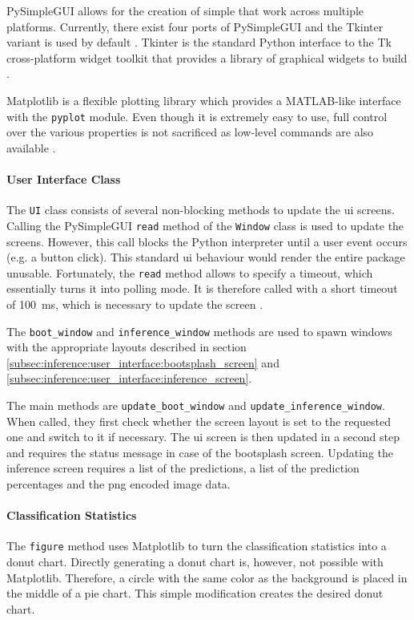 PySimpleGUI allows for the creation of simple  that work across multiple platforms.
Currently, there exist four ports of PySimpleGUI and the Tkinter variant is used by default \cite{inf_pysimplegui}.
Tkinter is the standard Python interface to the Tk cross-platform widget toolkit that provides a library of graphical widgets to build  \cite{inf_tkinter}.

Matplotlib is a flexible plotting library which provides a MATLAB-like interface with the \texttt{pyplot} module.
Even though it is extremely easy to use, full control over the various properties is not sacrificed as low-level commands are also available \cite{inf_matplotlib}.

\paragraph{User Interface Class}
The \texttt{UI} class consists of several non-blocking methods to update the \acrlong{ui} screens.
Calling the PySimpleGUI \texttt{read} method of the \texttt{Window} class is used to update the screens.
However, this call blocks the Python interpreter until a user event occurs (e.g. a button click).
This standard \acrlong{ui} behaviour would render the entire package unusable.
Fortunately, the \texttt{read} method allows to specify a timeout, which essentially turns it into polling mode.
It is therefore called with a short timeout of \SI{100}{ms}, which is necessary to update the screen \cite{inf_pysimplegui_ref}.

The \texttt{boot\_window} and \texttt{inference\_window} methods are used to spawn windows with the appropriate layouts described in section \ref{subsec:inference:user_interface:bootsplash_screen} and \ref{subsec:inference:user_interface:inference_screen}.

The main methods are \texttt{update\_boot\_window} and \texttt{update\_inference\_window}.
When called, they first check whether the screen layout is set to the requested one and switch to it if necessary.
The \acrlong{ui} screen is then updated in a second step and requires the status message in case of the bootsplash screen.
Updating the inference screen requires a list of the predictions, a list of the prediction percentages and the \acrshort{png} encoded image data.

\paragraph{Classification Statistics}
The \texttt{figure} method uses Matplotlib to turn the classification statistics into a donut chart.
Directly generating a donut chart is, however, not possible with Matplotlib.
Therefore, a circle with the same color as the background is placed in the middle of a pie chart.
This simple modification creates the desired donut chart.

